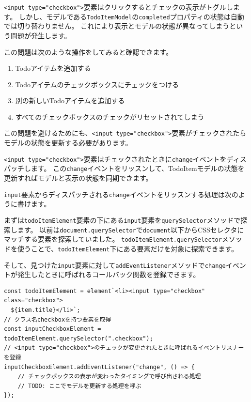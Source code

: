 \texttt{<input type="checkbox">}要素はクリックするとチェックの表示がトグルします。
しかし、モデルである\texttt{TodoItemModel}の\texttt{completed}プロパティの状態は自動では切り替わりません。
これにより表示とモデルの状態が異なってしまうという問題が発生します。

この問題は次のような操作をしてみると確認できます。

\begin{enumerate}
\def\labelenumi{\arabic{enumi}.}
\item
  Todoアイテムを追加する
\item
  Todoアイテムのチェックボックスにチェックをつける
\item
  別の新しいTodoアイテムを追加する
\item
  すべてのチェックボックスのチェックがリセットされてしまう
\end{enumerate}

この問題を避けるためにも、\texttt{<input type="checkbox">}要素がチェックされたらモデルの状態を更新する必要があります。

\texttt{<input type="checkbox">}要素はチェックされたときに\texttt{change}イベントをディスパッチします。
この\texttt{change}イベントをリッスンして、TodoItemモデルの状態を更新すればモデルと表示の状態を同期できます。

\texttt{input}要素からディスパッチされる\texttt{change}イベントをリッスンする処理は次のように書けます。

まずは\texttt{todoItemElement}要素の下にある\texttt{input}要素を\texttt{querySelector}メソッドで探索します。
以前は\texttt{document.querySelector}で\texttt{document}以下からCSSセレクタにマッチする要素を探索していました。
\texttt{todoItemElement.querySelector}メソッドを使うことで、\texttt{todoItemElement}下にある要素だけを対象に探索できます。

そして、見つけた\texttt{input}要素に対して\texttt{addEventListener}メソッドで\texttt{change}イベントが発生したときに呼ばれるコールバック関数を登録できます。

\begin{lstlisting}
const todoItemElement = element`<li><input type="checkbox" class="checkbox">
  ${item.title}</li>`;
// クラス名checkboxを持つ要素を取得
const inputCheckboxElement = todoItemElement.querySelector(".checkbox");
// <input type="checkbox">のチェックが変更されたときに呼ばれるイベントリスナーを登録
inputCheckboxElement.addEventListener("change", () => {
    // チェックボックスの表示が変わったタイミングで呼び出される処理
    // TODO: ここでモデルを更新する処理を呼ぶ
});
\end{lstlisting}

